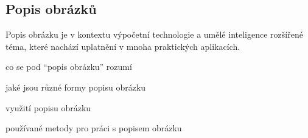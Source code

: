 \newpage
\subsection{Popis obrázků}
Popis obrázku je v kontextu výpočetní technologie a umělé inteligence rozšířené téma, které nachází uplatnění v mnoha praktických aplikacích.


{\color{blue}co se pod \enquote{popis obrázku} rozumí}

{\color{blue}jaké jsou různé formy popisu obrázku}

{\color{blue}využití popisu obrázku}

{\color{blue}používané metody pro práci s popisem obrázku}
